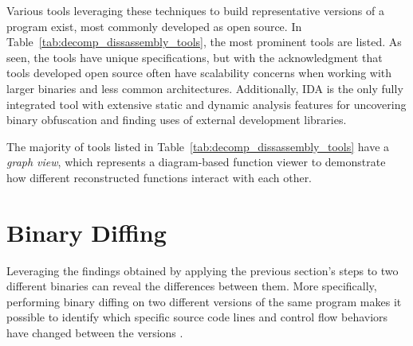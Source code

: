Various tools leveraging these techniques to build representative versions of a program exist, most commonly developed as open source. In Table~\ref{tab:decomp_dissassembly_tools}, the most prominent tools are listed. As seen, the tools have unique specifications, but with the acknowledgment that tools developed open source often have scalability concerns when working with larger binaries and less common architectures. Additionally, IDA is the only fully integrated tool with extensive static and dynamic analysis features for uncovering binary obfuscation and finding uses of external development libraries.

The majority of tools listed in Table~\ref{tab:decomp_dissassembly_tools} have a \textit{graph view}, which represents a diagram-based function viewer to demonstrate how different reconstructed functions interact with each other. %


\section{Binary Diffing}
\label{sec:background:binary_diffing}

Leveraging the findings obtained by applying the previous section’s steps to two different binaries can reveal the differences between them. More specifically, performing binary diffing on two different versions of the same program makes it possible to identify which specific source code lines and control flow behaviors have changed between the versions \cite{Ethical_Hackers_Handbook_fourth}.

